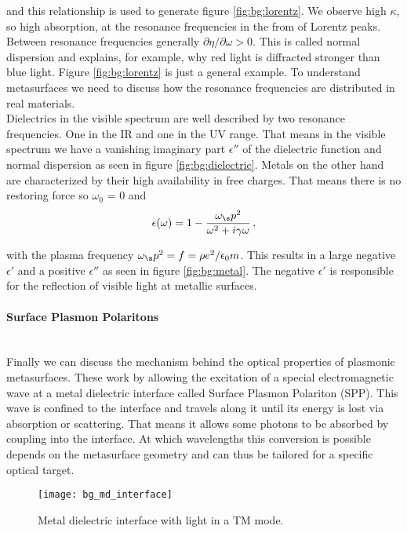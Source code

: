 and this relationship is used to generate figure \ref{fig:bg:lorentz}. We observe high $\kappa$, so high absorption, at the resonance frequencies in the from of Lorentz peaks. Between resonance frequencies generally 
$\partial \eta / \partial \omega > 0$.
This is called normal dispersion and explains, for example, why red light is diffracted stronger than blue light.
Figure \ref{fig:bg:lorentz} is just a general example. To understand metasurfaces we need to discuss how the resonance frequencies are distributed in real materials.
\\

\indent
Dielectrics in the visible spectrum are well described by two resonance frequencies. One in the IR and one in the UV range. That means in the visible spectrum we have a vanishing imaginary part $\epsilon''$ of the dielectric function and normal dispersion as seen in figure \ref{fig:bg:dielectric}. 
Metals on the other hand are characterized by their high availability in free charges. That means there is no restoring force so 
$\omega_0$ = 0 and
\begin{equation}
    \epsilon(\omega) = 1 - \frac{\omega_\s p^2}{\omega^2 + i \gamma \omega}\, ,
\end{equation}

with the plasma frequency 
$\omega_\s p^2 = f = \rho e^2 / \epsilon_0 m$.
This results in a large negative $\epsilon'$ and a positive $\epsilon''$ as seen in figure \ref{fig:bg:metal}. The negative $\epsilon'$ is responsible for the reflection of visible light at metallic surfaces.

\paragraph{Surface Plasmon Polaritons}~\\
Finally we can discuss the mechanism behind the optical properties of plasmonic metasurfaces. These work by allowing the excitation of a special electromagnetic wave at a metal dielectric interface called Surface Plasmon Polariton (SPP). This wave is confined to the interface and travels along it until its energy is lost via absorption or scattering. That means it allows some photons to be absorbed by coupling into the interface. At which wavelengths this conversion is possible depends on the metasurface geometry and can thus be tailored for a specific optical target.

\begin{figure}[H]
    \centering
    \texttt{[image: bg\_md\_interface]}
    \caption{Metal dielectric interface with light in a TM mode.}
    \label{fig:bg:md_inderface}
\end{figure}

